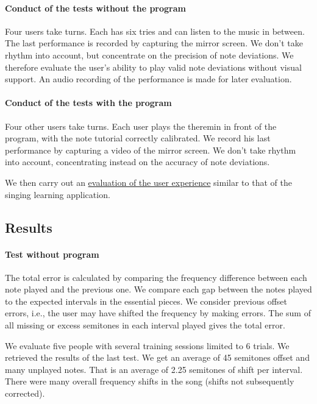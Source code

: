 \paragraph[]{Conduct of the tests without the program}
Four users take turns. Each has six tries and can listen to the music in between. The last performance is recorded by capturing the mirror screen. We don't take rhythm into account, but concentrate on the precision of note deviations. We therefore evaluate the user's ability to play valid note deviations without visual support. An audio recording of the performance is made for later evaluation.

\paragraph[]{Conduct of the tests with the program}
Four other users take turns. Each user plays the theremin in front of the program, with the note tutorial correctly calibrated. We record his last performance by capturing a video of the mirror screen. We don't take rhythm into account, concentrating instead on the accuracy of note deviations.

We then carry out an \hyperref[sec:eval_user_exp]{evaluation of the user experience} similar to that of the singing learning application.

\subsection{Results}

\paragraph{Test without program}
The total error is calculated by comparing the frequency difference between each note played and the previous one. We compare each gap between the notes played to the expected intervals in the essential pieces. We consider previous offset errors, i.e., the user may have shifted the frequency by making errors. The sum of all missing or excess semitones in each interval played gives the total error.

We evaluate five people with several training sessions limited to 6 trials. We retrieved the results of the last test. We get an average of 45 semitones offset and many unplayed notes. That is an average of 2.25 semitones of shift per interval. There were many overall frequency shifts in the song (shifts not subsequently corrected).

